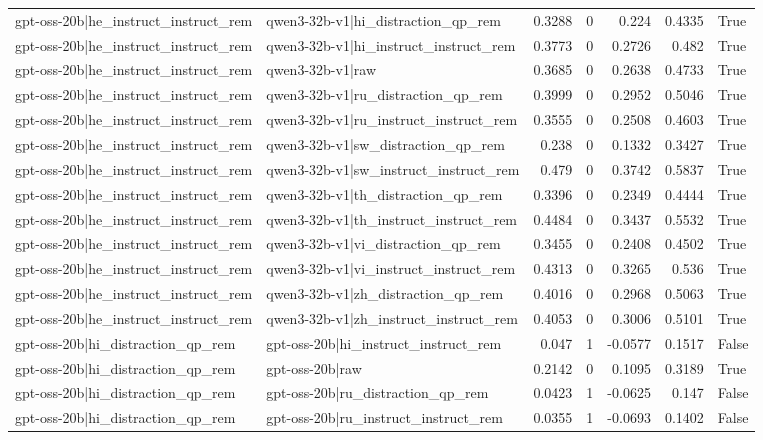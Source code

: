 \begin{table}
\begin{tabular}{l l r r r r l}
gpt-oss-20b|he_instruct_instruct_rem & qwen3-32b-v1|hi_distraction_qp_rem & 0.3288 & 0 & 0.224 & 0.4335 & True \\
gpt-oss-20b|he_instruct_instruct_rem & qwen3-32b-v1|hi_instruct_instruct_rem & 0.3773 & 0 & 0.2726 & 0.482 & True \\
gpt-oss-20b|he_instruct_instruct_rem & qwen3-32b-v1|raw & 0.3685 & 0 & 0.2638 & 0.4733 & True \\
gpt-oss-20b|he_instruct_instruct_rem & qwen3-32b-v1|ru_distraction_qp_rem & 0.3999 & 0 & 0.2952 & 0.5046 & True \\
gpt-oss-20b|he_instruct_instruct_rem & qwen3-32b-v1|ru_instruct_instruct_rem & 0.3555 & 0 & 0.2508 & 0.4603 & True \\
gpt-oss-20b|he_instruct_instruct_rem & qwen3-32b-v1|sw_distraction_qp_rem & 0.238 & 0 & 0.1332 & 0.3427 & True \\
gpt-oss-20b|he_instruct_instruct_rem & qwen3-32b-v1|sw_instruct_instruct_rem & 0.479 & 0 & 0.3742 & 0.5837 & True \\
gpt-oss-20b|he_instruct_instruct_rem & qwen3-32b-v1|th_distraction_qp_rem & 0.3396 & 0 & 0.2349 & 0.4444 & True \\
gpt-oss-20b|he_instruct_instruct_rem & qwen3-32b-v1|th_instruct_instruct_rem & 0.4484 & 0 & 0.3437 & 0.5532 & True \\
gpt-oss-20b|he_instruct_instruct_rem & qwen3-32b-v1|vi_distraction_qp_rem & 0.3455 & 0 & 0.2408 & 0.4502 & True \\
gpt-oss-20b|he_instruct_instruct_rem & qwen3-32b-v1|vi_instruct_instruct_rem & 0.4313 & 0 & 0.3265 & 0.536 & True \\
gpt-oss-20b|he_instruct_instruct_rem & qwen3-32b-v1|zh_distraction_qp_rem & 0.4016 & 0 & 0.2968 & 0.5063 & True \\
gpt-oss-20b|he_instruct_instruct_rem & qwen3-32b-v1|zh_instruct_instruct_rem & 0.4053 & 0 & 0.3006 & 0.5101 & True \\
gpt-oss-20b|hi_distraction_qp_rem & gpt-oss-20b|hi_instruct_instruct_rem & 0.047 & 1 & -0.0577 & 0.1517 & False \\
gpt-oss-20b|hi_distraction_qp_rem & gpt-oss-20b|raw & 0.2142 & 0 & 0.1095 & 0.3189 & True \\
gpt-oss-20b|hi_distraction_qp_rem & gpt-oss-20b|ru_distraction_qp_rem & 0.0423 & 1 & -0.0625 & 0.147 & False \\
gpt-oss-20b|hi_distraction_qp_rem & gpt-oss-20b|ru_instruct_instruct_rem & 0.0355 & 1 & -0.0693 & 0.1402 & False \\

\end{tabular}
\end{table}
